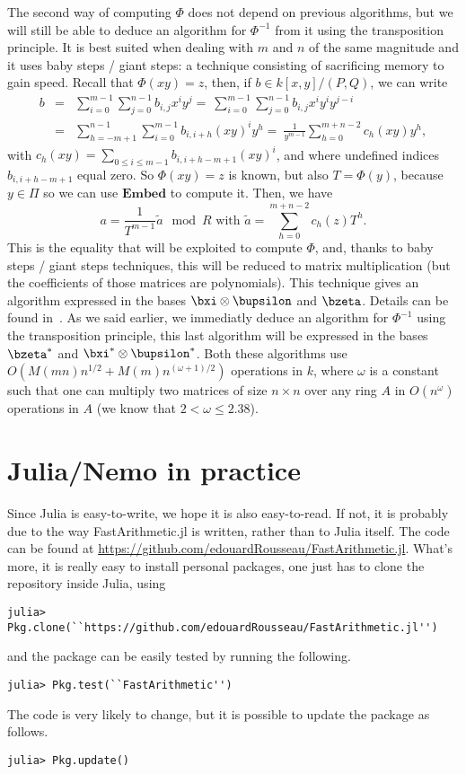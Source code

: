\documentclass[a4paper,11pt]{article}
\theoremstyle{break}
\theoremstyle{definition}
\theoremstyle{remark}
\begin{document}
The second way of computing $\Phi$ does not depend on previous algorithms, but 
we will still be able to deduce an algorithm for $\Phi^{-1}$ from it using the 
transposition principle. It is best suited when dealing with $m$ and $n$ of the 
same magnitude and it uses baby steps / giant steps: a technique consisting of 
sacrificing memory to gain speed. Recall that $\Phi(xy)=z$, then, if $b\in 
k[x,y]/(P,Q)$, we can write
\begin{eqnarray*}
b&=&\sum_{i=0}^{m-1}\sum_{j=0}^{n-1} b_{i,j}x^i y^j
=~\sum_{i=0}^{m-1}\sum_{j=0}^{n-1} b_{i,j}x^i y^i y^{j-i}\\
&=&\sum_{h=-m+1}^{n-1}\sum_{i=0}^{m-1} b_{i,i+h}(xy)^i y^h
=~\frac{1}{y^{m-1}} \sum_{h=0}^{m+n-2} c_h(xy) y^h,
\end{eqnarray*}
with $c_h(xy)=\sum_{0 \leq i \leq m-1} b_{i,i+h-m+1} (xy)^i$, and where 
undefined indices $b_{i,i+h-m+1}$ equal zero. So $\Phi(xy)=z$ is known, but 
also $T=\Phi(y)$, because $y\in\Pi$ so we can use $\textbf{Embed}$ to compute 
it. Then, we have 
\[
a = \frac{1}{T^{m-1}}\tilde a \mod R \text{ with } \tilde a = \sum_{h=0}^{m+n-2} 
c_h(z) T^h.
\]
This is the equality that will be exploited to compute $\Phi$, and, thanks to 
baby steps / giant steps techniques, this will be reduced to matrix 
multiplication (but the coefficients of those matrices are polynomials). This 
technique gives an algorithm expressed in the bases $\bxi\otimes\bupsilon$ and 
$\bzeta$. Details can be found in~\cite{DeDoSc14}. As we said earlier, we 
immediatly deduce an algorithm for $\Phi^{-1}$ using the 
transposition principle, this last algorithm will be expressed in the bases 
$\bzeta^*$ and $\bxi^*\otimes\bupsilon^*$. Both these algorithms use 
$O(M(mn)n^{1/2}+M(m)n^{(\omega+1)/2})$ operations in $k$, where $\omega$ is a 
constant such that one can multiply two matrices of size $n\times n$ over any 
ring $A$ in $O(n^\omega)$ operations in $A$ (we know that $2 < \omega \leq 
2.38$).


\section{Julia/Nemo in practice}
Since Julia is easy-to-write, we hope it is also
easy-to-read. If not, it is probably due to the way FastArithmetic.jl is written,
rather than to Julia itself. The code can be found at
\url{https://github.com/edouardRousseau/FastArithmetic.jl}. What's more, it is really
easy to install personal packages, one just has to clone the repository
inside Julia, using
\begin{verbatim}
julia> Pkg.clone(``https://github.com/edouardRousseau/FastArithmetic.jl'') 
\end{verbatim}
and the package can be easily tested by running the following.
\begin{verbatim}
julia> Pkg.test(``FastArithmetic'') 
\end{verbatim}
The code is very likely to change, but it is possible to update the package as
follows.
\begin{verbatim}
julia> Pkg.update()
\end{verbatim}
\end{document}
